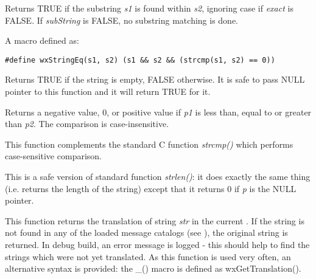 Returns TRUE if the substring {\it s1} is found within {\it s2},
ignoring case if {\it exact} is FALSE. If {\it subString} is FALSE,
no substring matching is done.

\label{wxstringeq}


A macro defined as:

\begin{verbatim}
#define wxStringEq(s1, s2) (s1 && s2 && (strcmp(s1, s2) == 0))
\end{verbatim}

\label{isempty}


Returns TRUE if the string is empty, FALSE otherwise. It is safe to pass NULL
pointer to this function and it will return TRUE for it.

\label{stricmp}


Returns a negative value, 0, or positive value if {\it p1} is less than, equal
to or greater than {\it p2}. The comparison is case-insensitive.

This function complements the standard C function {\it strcmp()} which performs
case-sensitive comparison.

\label{strlen}


This is a safe version of standard function {\it strlen()}: it does exactly the
same thing (i.e. returns the length of the string) except that it returns 0 if
{\it p} is the NULL pointer.

\label{wxgettranslation}


This function returns the translation of string {\it str} in the current 
. If the string is not found in any of the loaded
message catalogs (see ), the
original string is returned. In debug build, an error message is logged - this
should help to find the strings which were not yet translated. As this function
is used very often, an alternative syntax is provided: the \_() macro is
defined as wxGetTranslation().

